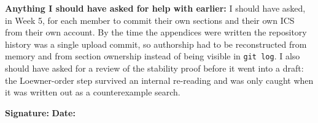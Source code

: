 \begin{formbox}
\textbf{Anything I should have asked for help with earlier:}
I should have asked, in Week 5, for each member to commit their own sections and
their own ICS from their own account. By the time the appendices were written
the repository history was a single upload commit, so authorship had to be
reconstructed from memory and from section ownership instead of being visible in
\texttt{git log}. I also should have asked for a review of the stability proof
before it went into a draft: the Loewner-order step survived an internal
re-reading and was only caught when it was written out as a counterexample
search.

\vspace{0.8em}
\textbf{Signature:} \underline{\hspace{5cm}} \hfill
\textbf{Date:} \underline{\hspace{3cm}}
\end{formbox}
